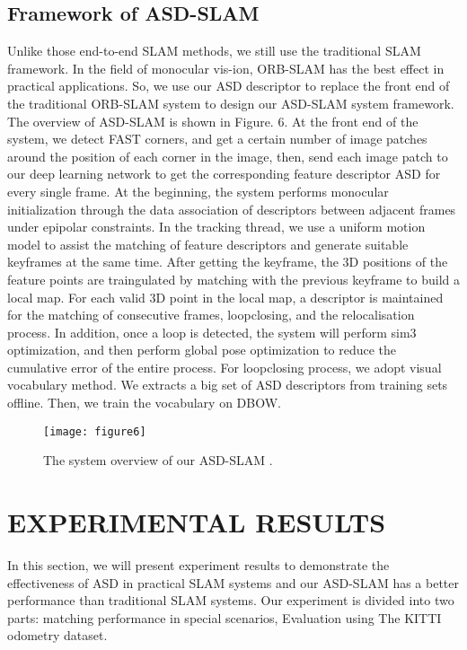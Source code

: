 \documentclass[letterpaper, 10 pt, conference]{ieeeconf}  %
\begin{document}
\subsection{Framework of ASD-SLAM}
Unlike those end-to-end SLAM methods, we still use the traditional SLAM framework. In the field of monocular vis-ion, ORB-SLAM has the best effect in practical applications. So, we use our ASD descriptor to replace the front end of the traditional ORB-SLAM system to design our ASD-SLAM system framework. The overview of ASD-SLAM is shown in Figure. 6. At the front end of the system, we detect FAST corners, and get a certain number of image patches around the position of each corner in the image, then, send each image patch to our deep learning network to get the corresponding feature descriptor ASD for every single frame. At the beginning, the system performs monocular initialization through the data association of descriptors between adjacent frames under epipolar constraints. In the tracking thread, we use a uniform motion model to assist the matching of feature descriptors and generate suitable keyframes at the same time. After getting the keyframe, the 3D positions of the feature points are traingulated by matching with the previous keyframe to build a local map. For each valid 3D point in the local map, a descriptor is maintained for the matching of consecutive frames, loopclosing, and the relocalisation process. In addition, once a loop is detected, the system will perform sim3 optimization, and then perform global pose optimization to reduce the cumulative error of the entire process. For loopclosing process, we adopt visual vocabulary method. We extracts a big set of ASD descriptors from training sets offline. Then, we train the vocabulary on DBOW.

\begin{figure}[h]
\centering
\texttt{[image: figure6]}
\caption{The system overview of our ASD-SLAM .}
\end{figure}
\section{EXPERIMENTAL RESULTS}
In this section, we will present experiment results to demonstrate the effectiveness of ASD in practical SLAM systems and our ASD-SLAM has a better performance than  traditional SLAM systems. Our experiment is divided into two parts:  matching performance in special scenarios, Evaluation using The KITTI odometry dataset. 
\end{document}
